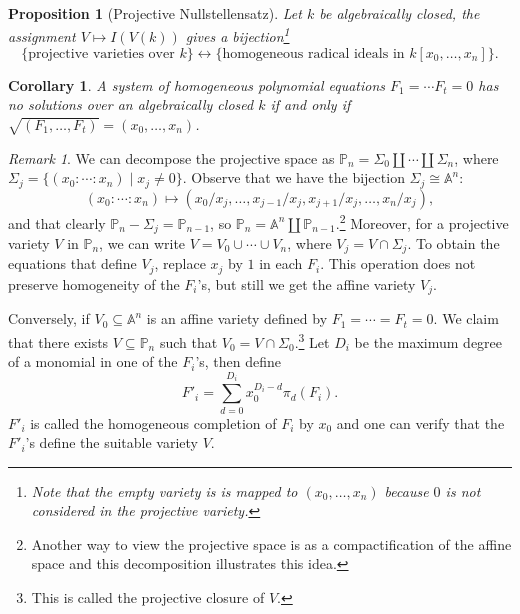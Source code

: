 \documentclass{tufte-handout} %
\newtheorem{cor}[thm]{Corollary}
\newtheorem{prop}[thm]{Proposition}
\theoremstyle{definition}
\theoremstyle{remark}
\newtheorem{rem}[thm]{Remark}
\newcommand{\bA}{\mathbb{A}}
\renewcommand{\P}{\mathbb{P}}
\begin{document}
\begin{prop}[Projective Nullstellensatz]
	Let $k$ be algebraically closed, the assignment $V \mapsto I(V(k))$ gives a bijection\footnote{Note that the empty variety is is mapped to $(x_0, \dots, x_n)$ because $0$ is not considered in the projective variety.}
	\[\{\text{projective varieties over $k$}\} \leftrightarrow \{\text{homogeneous radical ideals in } k[x_0, \dots, x_n]\}.\]
	
\end{prop}
\begin{cor}
	A system of homogeneous polynomial equations $F_1 = \cdots F_t = 0$ has no solutions over an algebraically closed $k$ if and only if $\sqrt{(F_1, \dots, F_t)} = (x_0, \dots, x_n)$.
\end{cor}
\begin{rem} We can decompose the projective space as $\P_n = \Sigma_0 \amalg \cdots \amalg \Sigma_n$, where $\Sigma_j = \{(x_0: \cdots : x_n) \mid x_j \neq 0\}$. Observe that we have the bijection $\Sigma_j \cong \bA^n$: \[(x_0:\cdots : x_n)\mapsto (x_0/x_j , \dots,x_{j-1}/x_j,x_{j+1}/x_j,\dots, x_n/x_j),\] and that clearly $\P_n - \Sigma_j = \P_{n-1}$, so $\P_n = \bA^n \amalg \P_{n-1}$.\footnote{Another way to view the projective space is as a compactification of the affine space and this decomposition illustrates this idea.} Moreover, for a projective variety $V$ in $\P_n$, we can write $V = V_0 \cup \cdots \cup V_n$, where $V_j = V \cap \Sigma_j$. To obtain the equations that define $V_j$, replace $x_j$ by $1$ in each $F_i$. This operation does not preserve homogeneity of the $F_i$'s, but still we get the affine variety $V_j$.

Conversely, if $V_0 \subseteq \bA^n$ is an affine variety defined by $F_1 = \cdots = F_t = 0$. We claim that there exists $V \subseteq \P_n$ such that $V_0 = V \cap \Sigma_0$.\footnote{This is called the projective closure of $V$.} Let $D_i$ be the maximum degree of a monomial in one of the $F_i$'s, then define
\[F'_i = \sum_{d=0}^{D_i} x_0^{D_i-d}\pi_d(F_i).\] $F'_i$ is called the homogeneous completion of $F_i$ by $x_0$ and one can verify that the $F'_i$'s define the suitable variety $V$.%
\end{rem}

\end{document}
